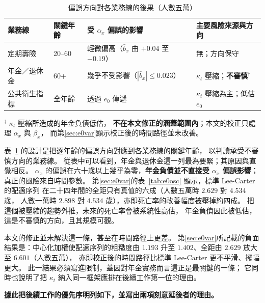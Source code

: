 \documentclass[UTF8, fontset=macnew, a4paper, 12pt]{ctexart}
\begin{document}
\begin{table}[H]
\centering
\caption{偏誤方向對各業務線的後果（人數五萬）}
\small
\begin{tabular}{llll}
\toprule
業務線 & 關鍵年齡 & 受 $\alpha_x$ 偏誤的影響 & 主要風險來源與方向\\
\midrule
定期壽險     & 20--60 & 輕微偏高（$\bar b_x$ 由 $+0.04$ 至 $-0.19$） & 無；方向保守\\
年金／退休金 & 60$+$  & 幾乎不受影響（$|\bar b_x|\le0.023$） & $\kappa_t$ 壓縮；\textbf{不審慎}$^{\dagger}$\\
公共衛生指標 & 全年齡 & 透過 $e_0$ 傳遞 & $\kappa_t$ 壓縮為主；低估 $e_0$\\
\bottomrule
\end{tabular}
\vspace{3pt}
{\footnotesize $^{\dagger}$ $\kappa_t$ 壓縮所造成的年金負債低估，
\textbf{不在本文修正的涵蓋範圍內}；本文的校正只處理 $\alpha_x$ 與 $\beta_x$，
而第\ref{sec:e0var}顯示校正後的時間路徑並未改善。}
\label{tab:risk}
\end{table}

表~\ref{tab:risk} 的設計是把逐年齡的偏誤方向對應到各業務線的關鍵年齡，
以判讀承受不審慎方向的業務線。
從表中可以看到，年金與退休金這一列最為要緊；其原因與直覺相反。
$\alpha_x$ 的偏誤在六十歲以上幾乎為零，\textbf{年金負債並不直接受
$\alpha_x$ 偏誤影響}；真正的風險來自時間參數。
第\ref{sec:e0var}的表~\ref{tab:e0osc} 顯示，標準 Lee-Carter 的配適序列
在二十四年間的全距只有真值的六成（人數五萬時 $2.629$ 對 $4.534$ 歲，
人數一萬時 $2.898$ 對 $4.534$ 歲），亦即死亡率的改善幅度被壓掉約四成。
把這個被壓縮的趨勢外推，未來的死亡率會被系統性高估，
年金負債因此被低估，這是不審慎的方向，且其規模可觀。

本文的修正並未解決這一條，甚至在時間路徑上更差。
第\ref{sec:e0var}所記載的負面結果是：中心化加權使配適序列的粗糙度由
$1.193$ 升至 $1.402$、全距由 $2.629$ 放大至 $6.601$（人數五萬），
亦即校正後的時間路徑比標準 Lee-Carter 更不平滑、擺幅更大。
此一結果必須寫進限制，蓋因對年金實務而言這正是最關鍵的一條；
它同時也說明了把 $\kappa_t$ 納入同一框架應排在後續工作第一位的理由。

\textbf{據此把後續工作的優先序明列如下，並寫出兩項刻意延後者的理由。}
\end{document}
